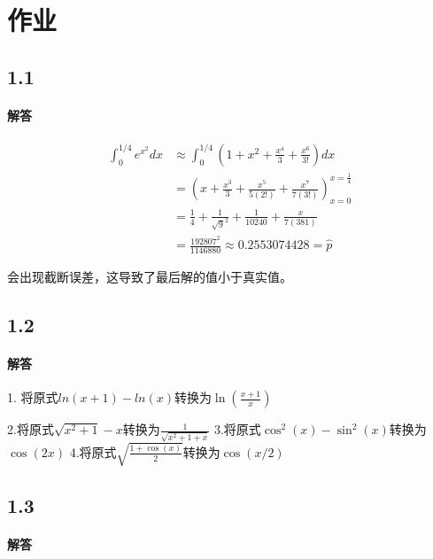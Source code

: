 \section{作业}


\subsection{1.1}

\paragraph{解答}

\begin{equation}
\begin{aligned} \int_{0}^{1 / 4} e^{x^{2}} d x & \approx \int_{0}^{1 / 4}\left(1+x^{2}+\frac{x^{4}}{3}+\frac{x^{6}}{3 !}\right) d x \\ &=\left(x+\frac{x^{3}}{3}+\frac{x^{5}}{5(2 !)}+\frac{x^{7}}{7(3 !)}\right)^{x=\frac{1}{4}}_{x=0}\\ &=\frac{1}{4}+\frac{1}{\sqrt{9}^{2}}+\frac{1}{10240}+\frac{x}{7(381)} \\ &=\frac{192807^{2}}{1146880} \approx 0.2553074428=\hat{p} \end{aligned}
\end{equation}



会出现截断误差，这导致了最后解的值小于真实值。

\subsection{1.2}

\paragraph{解答}

1. 将原式$ln(x+1)-ln(x)$转换为$\ln \left(\frac{x+1}{x}\right)$

2.将原式$\sqrt{x^{2}+1}-x$转换为$\frac{1}{\sqrt{x^{2}+1+x}}$
3.将原式$\cos ^{2}(x)-\sin ^{2}(x)$转换为$\cos (2 x)$
4.将原式$\sqrt{\frac{1+\cos (x)}{2}}$转换为$\cos (x / 2)$


\subsection{1.3}

\paragraph{解答}

